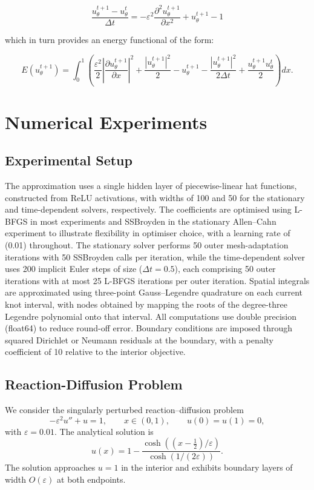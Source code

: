 \documentclass[11pt, onecolumn]{report}
\begin{document}
\begin{equation*}
    \frac{u_\theta^{t+1} - u_\theta^t}{\Delta t} = -\varepsilon^2 \frac{\partial^2 u_\theta^{t+1}}{\partial x^2} + u_\theta^{t+1} - 1
\end{equation*}

which in turn provides an energy functional of the form:

\begin{equation*}
    E(u_\theta^{t+1}) =\int_0^1 \left( \frac{\varepsilon^2}{2}\left|\frac{\partial u_\theta^{t+1}}{\partial x}\right|^2 + \frac{\left|u_\theta^{t+1}\right|^2}{2} - u_\theta^{t+1} - \frac{\left|u_\theta^{t+1}\right|^2}{2\Delta t} + \frac{u_\theta^{t+1}u_\theta^t}{2} \right)dx.
\end{equation*}




\section{Numerical Experiments}
\subsection{Experimental Setup}
The approximation uses a single hidden layer of piecewise-linear hat functions, constructed from ReLU activations, with widths of 100 and 50 for the stationary and time-dependent solvers, respectively. The coefficients are optimised using L-BFGS in most experiments and SSBroyden in the stationary Allen–Cahn experiment to illustrate flexibility in optimiser choice, with a learning rate of (0.01) throughout. The stationary solver performs 50 outer mesh-adaptation iterations with 50 SSBroyden calls per iteration, while the time-dependent solver uses 200 implicit Euler steps of size ($\Delta t=0.5$), each comprising 50 outer iterations with at most 25 L-BFGS iterations per outer iteration. Spatial integrals are approximated using three-point Gauss–Legendre quadrature on each current knot interval, with nodes obtained by mapping the roots of the degree-three Legendre polynomial onto that interval. All computations use double precision (float64) to reduce round-off error. Boundary conditions are imposed through squared Dirichlet or Neumann residuals at the boundary, with a penalty coefficient of 10 relative to the interior objective.


\subsection{Reaction-Diffusion Problem}
We consider the singularly perturbed reaction–diffusion problem
\begin{equation*}
-\varepsilon^2u''+u=1,\qquad x\in(0,1),\qquad u(0)=u(1)=0,
\end{equation*}
with \(\varepsilon=0.01\). The analytical solution is
\begin{equation*}
u(x)=1-\frac{\cosh((x-\tfrac12)/\varepsilon)}
{\cosh(1/(2\varepsilon))}.
\end{equation*}
The solution approaches $u=1$ in the interior and exhibits boundary layers of width \(O(\varepsilon)\) at both endpoints.
\end{document}
